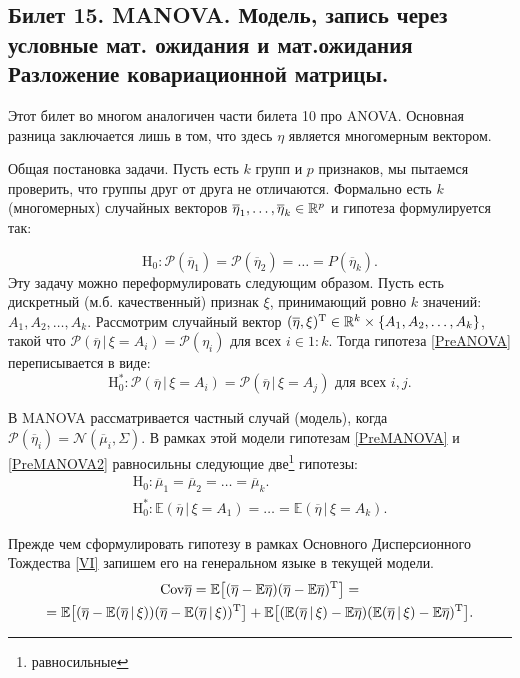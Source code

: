\subsection{ Билет 15. MANOVA. Модель, запись через условные мат. ожидания %
    и мат.ожидания
Разложение ковариационной матрицы. }
Этот билет во многом аналогичен части билета 10 про ANOVA.
Основная разница заключается лишь в том, что здесь $\eta$ является многомерным вектором.

Общая постановка задачи.
Пусть есть $k$ групп и $p$ признаков, мы пытаемся проверить, что группы друг от друга не отличаются.
Формально есть $k$ (многомерных) случайных векторов $\overline \eta_1, \ldots, \overline \eta_k \in \mathbb{R}^p$ и гипотеза формулируется так:

\begin{equation}
    \label{PreMANOVA}
    \mathrm H_0: \mathcal P(\overline \eta_1) = \mathcal P(\overline \eta_2) = \ldots \mathcal = P(\overline \eta_k).
\end{equation}
Эту задачу можно переформулировать следующим образом.
Пусть есть дискретный (м.б. качественный) признак $\xi$, принимающий ровно $k$ значений: $A_1, A_2, \ldots, A_k$.
Рассмотрим случайный вектор $(\overline \eta, \xi)^{\mathrm{T}} \in \mathbb{R}^k \times \{A_1, A_2, \ldots, A_k\}$,
такой что $\mathcal P(\overline \eta \, | \, \xi = A_i) = \mathcal P(\eta_i)$ для всех $i \in 1:k$.
Тогда гипотеза \eqref{PreANOVA} переписывается в виде:
\begin{equation}
    \label{PreMANOVA2}
    \mathrm H_0^*: \mathcal P(\overline \eta \, | \, \xi = A_i) = \mathcal P(\overline \eta \, | \, \xi = A_j) \text{ для всех $i, j$}.
\end{equation}

В MANOVA рассматривается частный случай (модель), когда $\mathcal P(\overline \eta_i) = \mathcal N(\overline \mu_i, \Sigma)$.
В рамках этой модели гипотезам \eqref{PreMANOVA} и \eqref{PreMANOVA2} равносильны следующие две\footnote{равносильные} гипотезы:
\begin{gather}
    \label{MANOVA}
    \mathrm H_0: \overline \mu_1 = \overline \mu_2 = \ldots = \overline \mu_k.\\
    \mathrm H_0^*: \mathbb E (\overline \eta \, | \, \xi = A_1) = \ldots = \mathbb E (\overline \eta \, | \, \xi = A_k).
    \nonumber
\end{gather}

Прежде чем сформулировать гипотезу в рамках Основного Дисперсионного Тождества \eqref{VI} запишем его на генеральном языке
в текущей модели.
\begin{gather}
    \label{MANOVA_VI_gen}
    \mathrm {Cov} \overline \eta =
    \mathbb E \big[(\overline \eta - \mathbb E \overline \eta) (\overline \eta - \mathbb E \overline \eta)^{\mathrm{T}}\big] = \\ =
    \mathbb E \big[(\overline \eta - \mathbb E (\overline \eta \, | \, \xi))
              (\overline \eta - \mathbb E (\overline \eta \, | \, \xi))^{\mathrm{T}}\big] +
    \mathbb E \big[(\mathbb E (\overline \eta \, | \, \xi) - \mathbb E \overline \eta)
              (\mathbb E (\overline \eta \, | \, \xi) - \mathbb E \overline \eta)^{\mathrm{T}}\big].
\end{gather}

